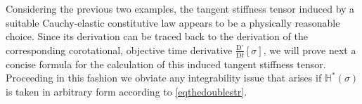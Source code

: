 \documentclass[10pt]{article}
\numberwithin{theoremCounter}{section}
\theoremstyle{plain}
\theoremstyle{definition}
\newcommand{\DD}{\mathrm{D}}
\DeclareMathOperator{\Sym}{Sym}
\def\H{\mathbb{H}}
\numberwithin{equation}{section}
\begin{document}
Considering the previous two examples, the tangent stiffness tensor induced by a suitable Cauchy-elastic constitutive law appears to be a physically reasonable choice. Since its derivation can be traced back to the derivation of the corresponding corotational, objective time derivative $\frac{\DD^{\circ}}{\DD t}[\sigma]$, we will prove next a concise formula for the calculation of this induced tangent stiffness tensor. Proceeding in this fashion we obviate any integrability issue \cite{ericksen1958hypo, bernstein1958} that arises if $\H^*(\sigma)$ is taken in arbitrary form according to \eqref{eqthedoublestr}.
%
%
\end{document}
